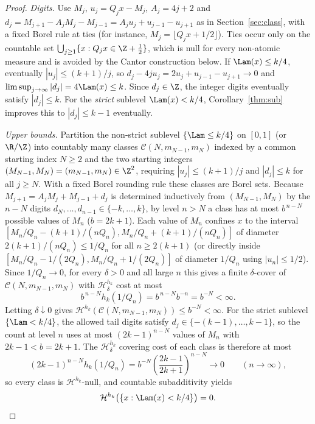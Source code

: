 \begin{proof}
\emph{Digits.} Use $M_j$, $u_j=Q_jx-M_j$, $A_j=4j+2$ and
$d_j=M_{j+1}-A_jM_j-M_{j-1}=A_ju_j+u_{j-1}-u_{j+1}$ as in
Section~\ref{sec:class}, with a fixed Borel rule at ties (for instance,
$M_j=\lfloor Q_jx+1/2\rfloor$). Ties occur only on the
countable set $\bigcup_{j\ge1}\{x:Q_jx\in\Z+\tfrac12\}$, which is null for every
non-atomic measure and is avoided by the Cantor construction below.
If $\Lam(x)\le k/4$, eventually $|u_j|\le(k+1)/j$, so
$d_j-4ju_j=2u_j+u_{j-1}-u_{j+1}\to0$ and
$\limsup_{j\to\infty}|d_j|=4\Lam(x)\le k$. Since $d_j\in\Z$, the integer digits
eventually satisfy $|d_j|\le k$. For the \emph{strict} sublevel $\Lam(x)<k/4$,
Corollary~\ref{thm:sub} improves this to $|d_j|\le k-1$ eventually.

\emph{Upper bounds.} Partition the non-strict sublevel $\{\Lam\le k/4\}$ on
$[0,1]$ (or $\R/\Z$) into countably many classes
$\mathcal C(N,m_{N-1},m_N)$ indexed by a common starting index $N\ge2$ and the
two starting integers $(M_{N-1},M_N)=(m_{N-1},m_N)\in\Z^2$, requiring
$|u_j|\le(k+1)/j$ and $|d_j|\le k$ for all $j\ge N$. With a fixed Borel rounding
rule these classes are Borel sets. Because $M_{j+1}=A_jM_j+M_{j-1}+d_j$ is
determined inductively from $(M_{N-1},M_N)$ by the $n-N$ digits
$d_N,\dots,d_{n-1}\in\{-k,\dots,k\}$, by level $n>N$ a class has at most
$b^{\,n-N}$ possible values of $M_n$ ($b=2k+1$). Each value of $M_n$ confines
$x$ to the interval $[M_n/Q_n-(k+1)/(nQ_n),M_n/Q_n+(k+1)/(nQ_n)]$ of diameter
$2(k+1)/(nQ_n)\le1/Q_n$ for all $n\ge2(k+1)$ (or directly inside
$[M_n/Q_n-1/(2Q_n),M_n/Q_n+1/(2Q_n)]$ of diameter $1/Q_n$ using $|u_n|\le1/2$).
Since $1/Q_n\to0$, for every $\delta>0$ and all large $n$ this gives a finite
$\delta$-cover of $\mathcal C(N,m_{N-1},m_N)$ with $\mathcal H_\delta^{h_k}$
cost at most
\[
b^{\,n-N}h_k(1/Q_n)=b^{\,n-N}b^{-n}=b^{-N}<\infty.
\]
Letting $\delta\downarrow0$ gives
$\mathcal H^{h_k}(\mathcal C(N,m_{N-1},m_N))\le b^{-N}<\infty$. For the strict
sublevel $\{\Lam<k/4\}$, the allowed tail digits satisfy
$d_j\in\{-(k-1),\dots,k-1\}$, so the count at level $n$ uses at most
$(2k-1)^{n-N}$ values of $M_n$ with $2k-1<b=2k+1$. The $\mathcal H_\delta^{h_k}$
covering cost of each class is therefore at most
\[
(2k-1)^{n-N}h_k(1/Q_n)=b^{-N}\left(\frac{2k-1}{2k+1}\right)^{n-N}\longrightarrow0
\qquad(n\to\infty),
\]
so every class is $\mathcal H^{h_k}$-null, and countable subadditivity yields
\begin{equation}\label{eq:strict-null}
 \mathcal H^{h_k}\bigl(\{x:\Lam(x)<k/4\}\bigr)=0 .
\end{equation}


\end{proof}
